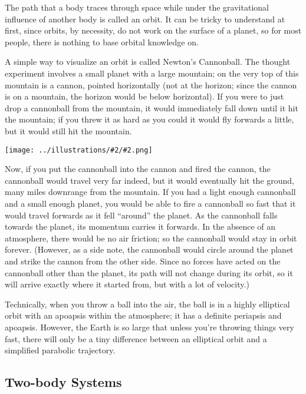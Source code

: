 \documentclass[oneside,a5paper]{book}
\newcommand{\widthillustration}[2]{{\centering\texttt{[image: ../illustrations/\#2/\#2.png]}}}
\begin{document}
The path that a body traces through space while under the
gravitational influence of another body is called an orbit. It can be
tricky to understand at first, since orbits, by necessity, do not work
on the surface of a planet, so for most people, there is nothing to
base orbital knowledge on.

A simple way to visualize an orbit is called Newton’s Cannonball. The
thought experiment involves a small planet with a large mountain; on
the very top of this mountain is a cannon, pointed horizontally (not
at the horizon; since the cannon is on a mountain, the horizon would
be below horizontal). If you were to just drop a cannonball from the
mountain, it would immediately fall down until it hit the mountain; if
you threw it as hard as you could it would fly forwards a little, but
it would still hit the mountain.

\begin{center}
  \widthillustration{0.5\linewidth}{newton-cannonball}
\end{center}

\vspace{-2em}

Now, if you put the cannonball into the cannon and fired the cannon,
the cannonball would travel very far indeed, but it would eventually
hit the ground, many miles downrange from the mountain. If you had a
light enough cannonball and a small enough planet, you would be able
to fire a cannonball so fast that it would travel forwards as it fell
``around'' the planet. As the cannonball falls towards the planet, its
momentum carries it forwards. In the absence of an atmosphere, there
would be no air friction; so the cannonball would stay in orbit
forever. (However, as a side note, the cannonball would circle around
the planet and strike the cannon from the other side. Since no forces
have acted on the cannonball other than the planet, its path will not
change during its orbit, so it will arrive exactly where it started
from, but with a lot of velocity.)

Technically, when you throw a ball into the air, the ball is in a
highly elliptical orbit with an apoapsis within the atmosphere; it has
a definite periapsis and apoapsis. However, the Earth is so large that
unless you’re throwing things very fast, there will only be a tiny
difference between an elliptical orbit and a simplified parabolic
trajectory.

\subsection{Two-body Systems}
\end{document}

